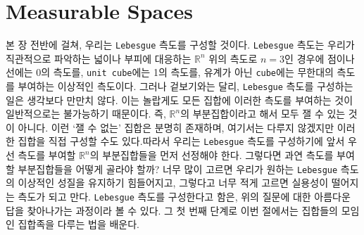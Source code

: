 
\section{Measurable Spaces}

본 장 전반에 걸쳐, 우리는 \texttt{Lebesgue} 측도를 구성할 것이다. \texttt{Lebesgue} 측도는 우리가 직관적으로 파악하는 넓이나 부피에 대응하는 $ \mathbb{R}^n$ 위의 측도로 $n=3$인 경우에 점이나 선에는 0의 측도를, \texttt{unit cube}에는 1의 측도를, 유계가 아닌 \texttt{cube}에는 무한대의 측도를 부여하는 이상적인 측도이다. 그러나 겉보기와는 달리, \texttt{Lebesgue} 측도를 구성하는 일은 생각보다 만만치 않다. 이는 놀랍게도 모든 집합에 이러한 측도를 부여하는 것이 일반적으로는 불가능하기 때문이다. 즉, $ \mathbb{R}^n$의 부분집합이라고 해서 모두 잴 수 있는 것이 아니다. 이런 `잴 수 없는' 집합은 분명히 존재하며, 여기서는 다루지 않겠지만 이러한 집합을 직접 구성할 수도 있다.\footnotemark 따라서 우리는 \texttt{Lebesgue} 측도를 구성하기에 앞서 우선 측도를 부여할 $\mathbb{R}^n$의 부분집합들을 먼저 선정해야 한다. 그렇다면 과연 측도를 부여할 부분집합들을 어떻게 골라야 할까? 너무 많이 고르면 우리가 원하는 \texttt{Lebesgue} 측도의 이상적인 성질을 유지하기 힘들어지고, 그렇다고 너무 적게 고르면 실용성이 떨어지는 측도가 되고 만다. \texttt{Lebesgue} 측도를 구성한다고 함은, 위의 질문에 대한 아름다운 답을 찾아나가는 과정이라 볼 수 있다. 그 첫 번째 단계로 이번 절에서는 집합들의 모임인 집합족을 다루는 법을 배운다.


